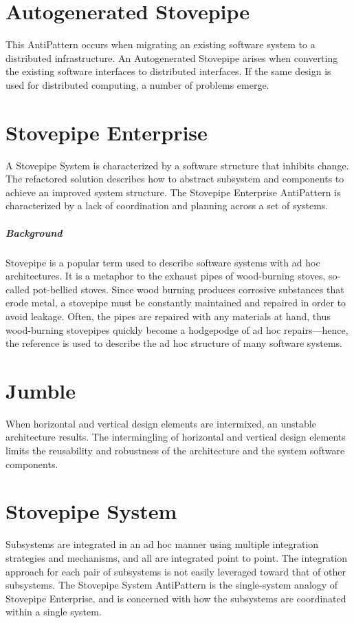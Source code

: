 \documentclass{book}
\begin{document}
\chapter{Autogenerated Stovepipe}
This AntiPattern occurs when migrating an existing software system to a distributed infrastructure.
An Autogenerated Stovepipe arises when converting the existing software interfaces to distributed interfaces.
If the same design is used for distributed computing, a number of problems emerge.
\chapter{Stovepipe Enterprise}
A Stovepipe System is characterized by a software structure that inhibits change.
The refactored solution describes how to abstract subsystem and components to achieve an improved system structure.
The Stovepipe Enterprise AntiPattern is characterized by a lack of coordination and planning across a set of systems.
\paragraph{Background}
Stovepipe is a popular term used to describe software systems with ad hoc architectures. It is a metaphor to the exhaust pipes of wood-burning stoves, so-called pot-bellied stoves.
Since wood burning produces corrosive substances that erode metal, a stovepipe must be constantly maintained and repaired in order to avoid leakage.
Often, the pipes are repaired with any materials at hand, thus wood-burning stovepipes quickly become a hodgepodge of ad hoc repairs—hence,
the reference is used to describe the ad hoc structure of many software systems.
\chapter{Jumble}
When horizontal and vertical design elements are intermixed, an unstable architecture results.
The intermingling of horizontal and vertical design elements limits the reusability and robustness of the architecture and the system software components.
\chapter{Stovepipe System}
Subsystems are integrated in an ad hoc manner using multiple integration strategies and mechanisms, and all are integrated point to point.
The integration approach for each pair of subsystems is not easily leveraged toward that of other subsystems.
The Stovepipe System AntiPattern is the single-system analogy of Stovepipe Enterprise, and is concerned with how the subsystems are coordinated within a single system.
\end{document}
